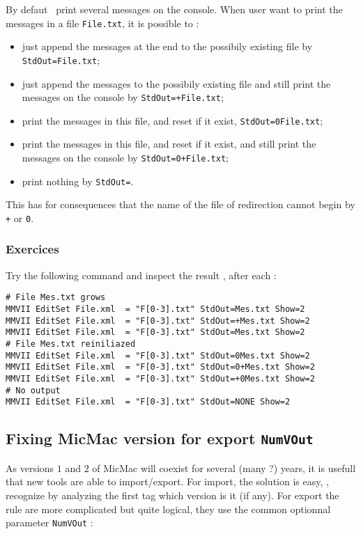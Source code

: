 By defaut \PPP\, print several messages on the console. When user want  to
print the messages in a file {\tt File.txt}, it is possible to :

\begin{itemize}
  \item just append the messages at the end to the possibily existing file  by {\tt StdOut=File.txt};
  \item just append the messages to the possibily existing file  and still print the messages on the console
        by {\tt StdOut=+File.txt};
  \item print  the messages in this file, and reset if it exist, {\tt StdOut=0File.txt};
  \item print  the messages in this file, and reset if it exist, and still print the 
       messages on the console by {\tt StdOut=0+File.txt};
  \item print  nothing by {\tt StdOut=\MMNONE}.
\end{itemize}

This has for consequences that the name of the file of redirection 
cannot begin by {\tt +} or {\tt 0}.

\subsubsection{Exercices}
Try the following command and inspect the result , after each :

\begin{verbatim}
# File Mes.txt grows
MMVII EditSet File.xml  = "F[0-3].txt" StdOut=Mes.txt Show=2
MMVII EditSet File.xml  = "F[0-3].txt" StdOut=+Mes.txt Show=2
MMVII EditSet File.xml  = "F[0-3].txt" StdOut=Mes.txt Show=2
# File Mes.txt reiniliazed
MMVII EditSet File.xml  = "F[0-3].txt" StdOut=0Mes.txt Show=2
MMVII EditSet File.xml  = "F[0-3].txt" StdOut=0+Mes.txt Show=2
MMVII EditSet File.xml  = "F[0-3].txt" StdOut=+0Mes.txt Show=2
# No output
MMVII EditSet File.xml  = "F[0-3].txt" StdOut=NONE Show=2
\end{verbatim}




\subsection{Fixing MicMac version for export {\tt NumVOut}}

As versions $1$ and $2$ of MicMac will coexist for several (many ?) years,
it is usefull that new tools are able to import/export. For import, the solution
is easy, \PPP, recognize by analyzing the first tag which version is it (if any).
For export the rule are more complicated but quite logical, they use the common
optionnal parameter {\tt NumVOut} :

